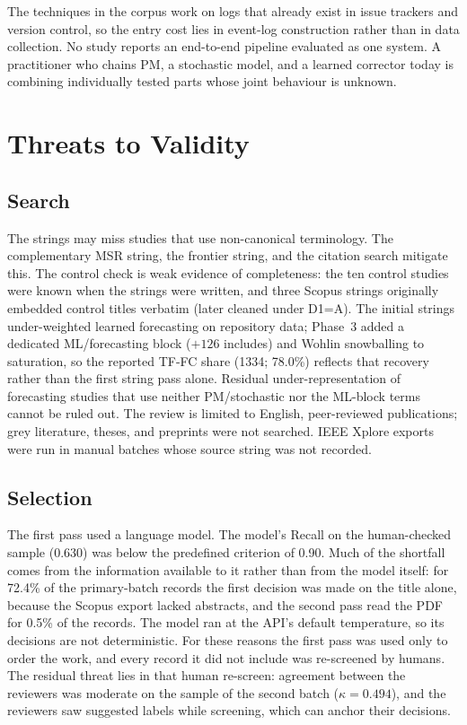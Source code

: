 \documentclass[preprint,12pt,authoryear=false]{elsarticle}
\newcommand{\FC}{TF-FC}
\begin{document}
The techniques in the corpus work on logs that already exist in issue trackers and version control, so the entry cost lies in event-log construction rather than in data collection. No study reports an end-to-end pipeline evaluated as one system. A practitioner who chains PM, a stochastic model, and a learned corrector today is combining individually tested parts whose joint behaviour is unknown.

\section{Threats to Validity}\label{sec:threats}

\subsection{Search}\label{sec:threats-search}

The strings may miss studies that use non-canonical terminology. The complementary MSR string, the frontier string, and the citation search mitigate this. The control check is weak evidence of completeness: the ten control studies were known when the strings were written, and three Scopus strings originally embedded control titles verbatim (later cleaned under D1=A). The initial strings under-weighted learned forecasting on repository data; Phase~3 added a dedicated ML/forecasting block ($+126$ includes) and Wohlin snowballing to saturation, so the reported \FC{} share (1334; 78.0\%) reflects that recovery rather than the first string pass alone. Residual under-representation of forecasting studies that use neither PM/stochastic nor the ML-block terms cannot be ruled out. The review is limited to English, peer-reviewed publications; grey literature, theses, and preprints were not searched. IEEE Xplore exports were run in manual batches whose source string was not recorded.

\subsection{Selection}

The first pass used a language model. The model's Recall on the human-checked sample (0.630) was below the predefined criterion of 0.90. Much of the shortfall comes from the information available to it rather than from the model itself: for 72.4\% of the primary-batch records the first decision was made on the title alone, because the Scopus export lacked abstracts, and the second pass read the PDF for 0.5\% of the records. The model ran at the API's default temperature, so its decisions are not deterministic. For these reasons the first pass was used only to order the work, and every record it did not include was re-screened by humans. The residual threat lies in that human re-screen: agreement between the reviewers was moderate on the sample of the second batch ($\kappa = 0.494$), and the reviewers saw suggested labels while screening, which can anchor their decisions.
\end{document}
